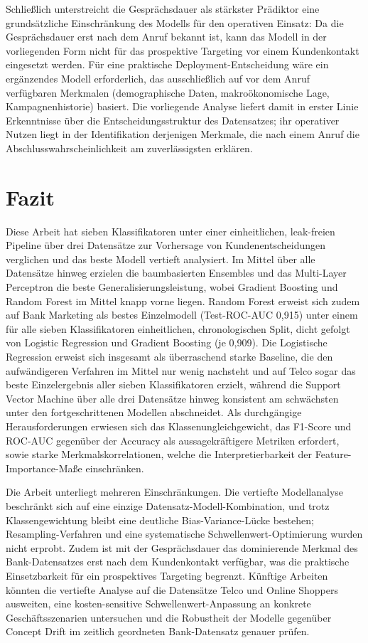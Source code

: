 \documentclass[10pt]{scrartcl}
\begin{document}
Schließlich unterstreicht die Gesprächsdauer als stärkster Prädiktor eine grundsätzliche Einschränkung des Modells für den operativen Einsatz: Da die Gesprächsdauer erst nach dem Anruf bekannt ist, kann das Modell in der vorliegenden Form nicht für das prospektive Targeting vor einem Kundenkontakt eingesetzt werden. Für eine praktische Deployment-Entscheidung wäre ein ergänzendes Modell erforderlich, das ausschließlich auf vor dem Anruf verfügbaren Merkmalen (demographische Daten, makroökonomische Lage, Kampagnenhistorie) basiert. Die vorliegende Analyse liefert damit in erster Linie Erkenntnisse über die Entscheidungsstruktur des Datensatzes; ihr operativer Nutzen liegt in der Identifikation derjenigen Merkmale, die nach einem Anruf die Abschlusswahrscheinlichkeit am zuverlässigsten erklären.

\section{Fazit}

Diese Arbeit hat sieben Klassifikatoren unter einer einheitlichen, leak-freien Pipeline über drei Datensätze zur Vorhersage von Kundenentscheidungen verglichen und das beste Modell vertieft analysiert. Im Mittel über alle Datensätze hinweg erzielen die baumbasierten Ensembles und das Multi-Layer Perceptron die beste Generalisierungsleistung, wobei Gradient Boosting und Random Forest im Mittel knapp vorne liegen. Random Forest erweist sich zudem auf Bank Marketing als bestes Einzelmodell (Test-ROC-AUC 0{,}915) unter einem für alle sieben Klassifikatoren einheitlichen, chronologischen Split, dicht gefolgt von Logistic Regression und Gradient Boosting (je 0{,}909). Die Logistische Regression erweist sich insgesamt als überraschend starke Baseline, die den aufwändigeren Verfahren im Mittel nur wenig nachsteht und auf Telco sogar das beste Einzelergebnis aller sieben Klassifikatoren erzielt, während die Support Vector Machine über alle drei Datensätze hinweg konsistent am schwächsten unter den fortgeschrittenen Modellen abschneidet. Als durchgängige Herausforderungen erwiesen sich das Klassenungleichgewicht, das F1-Score und ROC-AUC gegenüber der Accuracy als aussagekräftigere Metriken erfordert, sowie starke Merkmalskorrelationen, welche die Interpretierbarkeit der Feature-Importance-Maße einschränken.

Die Arbeit unterliegt mehreren Einschränkungen. Die vertiefte Modellanalyse beschränkt sich auf eine einzige Datensatz-Modell-Kombination, und trotz Klassengewichtung bleibt eine deutliche Bias-Variance-Lücke bestehen; Resampling-Verfahren und eine systematische Schwellenwert-Optimierung wurden nicht erprobt. Zudem ist mit der Gesprächsdauer das dominierende Merkmal des Bank-Datensatzes erst nach dem Kundenkontakt verfügbar, was die praktische Einsetzbarkeit für ein prospektives Targeting begrenzt. Künftige Arbeiten könnten die vertiefte Analyse auf die Datensätze Telco und Online Shoppers ausweiten, eine kosten-sensitive Schwellenwert-Anpassung an konkrete Geschäftsszenarien untersuchen und die Robustheit der Modelle gegenüber Concept Drift im zeitlich geordneten Bank-Datensatz genauer prüfen.
\end{document}
